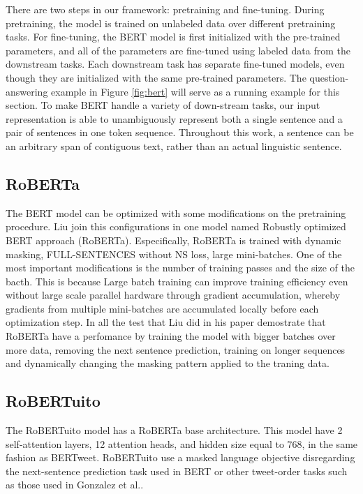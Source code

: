 There are two steps in our framework: pretraining and fine-tuning. During pretraining, the model is trained on unlabeled data over different pretraining tasks. For fine-tuning, the BERT model is first initialized with the pre-trained parameters, and all of the parameters are fine-tuned using labeled data from the downstream tasks. Each downstream task has separate fine-tuned models, even though they are initialized with the same pre-trained parameters. The question-answering example in Figure \ref{fig:bert} will serve as a running example for this section. To make BERT handle a variety of down-stream tasks, our input representation is able to unambiguously represent both a single sentence and a pair of sentences in one token sequence. Throughout this work, a sentence can be an arbitrary span of contiguous text, rather than an actual linguistic sentence.

\subsection{RoBERTa}

The BERT model can be optimized with some modifications on the pretraining procedure. Liu\cite{Liu_2019} join this configurations in one model named Robustly optimized BERT approach (RoBERTa). Especifically, RoBERTa is trained with dynamic masking, FULL-SENTENCES without NS loss, large mini-batches. One of the most important modifications is the number of training passes and the size of the bacth. This is because Large batch training can improve training efficiency even without large scale parallel hardware through gradient accumulation, whereby gradients from multiple mini-batches are accumulated locally before each optimization step\cite{Ott_2019}. In all the test that Liu\cite{Liu_2019} did in his paper demostrate that RoBERTa have a perfomance by training the model with bigger batches over more data, removing the next sentence prediction, training on longer sequences and dynamically changing the masking pattern applied to the traning data.

\subsection{RoBERTuito}

The RoBERTuito model has a RoBERTa base architecture. This model have 2 self-attention layers, 12 attention heads, and hidden size equal to 768, in the same fashion as BERTweet\cite{Nguyen_2020}. RoBERTuito use a masked language objective disregarding the next-sentence prediction task used in BERT or other tweet-order tasks such as those used in Gonzalez et al.\cite{Gonzalez_2021}.


